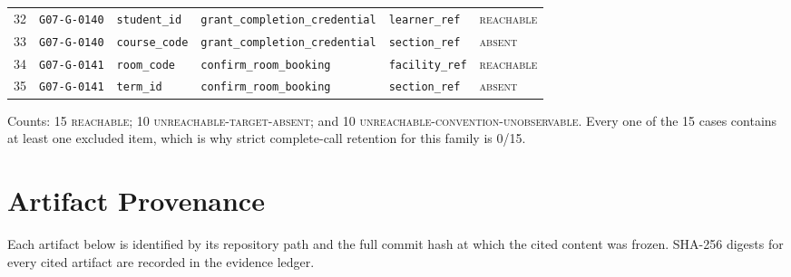 \documentclass[11pt]{article}
\newcommand{\st}[1]{\textsc{\small #1}}
\begin{document}
\begin{longtable}{@{}rlllll@{}}
\footnotesize 32 & \texttt{\footnotesize G07-G-0140} & \texttt{\footnotesize student\_id} & \texttt{\footnotesize grant\_completion\_credential} & \texttt{\footnotesize learner\_ref} & \st{reachable} \\
\footnotesize 33 & \texttt{\footnotesize G07-G-0140} & \texttt{\footnotesize course\_code} & \texttt{\footnotesize grant\_completion\_credential} & \texttt{\footnotesize section\_ref} & \st{absent} \\
\footnotesize 34 & \texttt{\footnotesize G07-G-0141} & \texttt{\footnotesize room\_code} & \texttt{\footnotesize confirm\_room\_booking} & \texttt{\footnotesize facility\_ref} & \st{reachable} \\
\footnotesize 35 & \texttt{\footnotesize G07-G-0141} & \texttt{\footnotesize term\_id} & \texttt{\footnotesize confirm\_room\_booking} & \texttt{\footnotesize section\_ref} & \st{absent} \\
\end{longtable}

Counts: 15 \st{reachable}; 10 \st{unreachable-target-absent}; and 10
\st{unreachable-\allowbreak convention-\allowbreak unobservable}. Every one of
the 15 cases contains at least one excluded item, which is why strict
complete-call retention for this family is 0/15.

\section{Artifact Provenance}
\label{app:traceability}

Each artifact below is identified by its repository path and the full commit
hash at which the cited content was frozen. SHA-256 digests for every cited
artifact are recorded in the evidence ledger.
\end{document}
